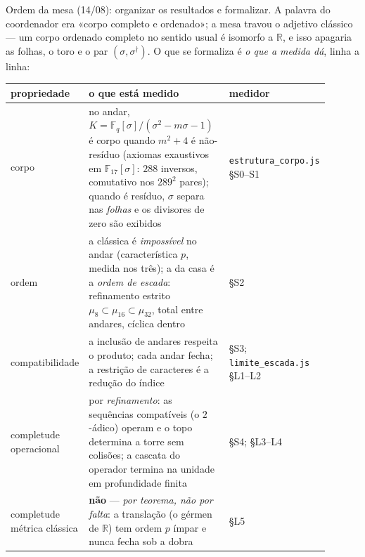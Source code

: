 \documentclass[11pt,a4paper]{article}
\newcommand{\code}[1]{\texttt{\small #1}}
\begin{document}
Ordem da mesa (14/08): organizar os resultados e formalizar. A palavra
do coordenador era «corpo completo e ordenado»; a mesa travou o
adjetivo clássico --- um corpo ordenado completo no sentido usual é
isomorfo a $\mathbb{R}$, e isso apagaria as folhas, o toro e o par
$(\sigma,\sigma^{\dagger})$. O que se formaliza é \emph{o que a medida
dá}, linha a linha:

\begin{center}
\begin{tabular}{p{0.21\linewidth}p{0.44\linewidth}p{0.25\linewidth}}
\textbf{propriedade} & \textbf{o que está medido} & \textbf{medidor} \\
\hline
corpo &
no andar, $K=\mathbb{F}_{q}[\sigma]/(\sigma^{2}{-}m\sigma{-}1)$ é
corpo quando $m^{2}{+}4$ é não-resíduo (axiomas exaustivos em
$\mathbb{F}_{17}[\sigma]$: $288$ inversos, comutativo nos $289^{2}$
pares); quando é resíduo, $\sigma$ separa nas \emph{folhas} e os
divisores de zero são exibidos &
\code{estrutura\_corpo.js} \S S0--S1 \\
ordem &
a clássica é \emph{impossível} no andar (característica $p$, medida
nos três); a da casa é a \emph{ordem de escada}: refinamento estrito
$\mu_{8}\subset\mu_{16}\subset\mu_{32}$, total entre andares,
cíclica dentro &
\S S2 \\
compatibilidade &
a inclusão de andares respeita o produto; cada andar fecha; a
restrição de caracteres é a redução do índice &
\S S3; \code{limite\_escada.js} \S L1--L2 \\
completude operacional &
por \emph{refinamento}: as sequências compatíveis (o $2$-ádico)
operam e o topo determina a torre sem colisões; a cascata do operador
termina na unidade em profundidade finita &
\S S4; \S L3--L4 \\
completude métrica clássica &
\textbf{não} --- \emph{por teorema, não por falta}: a translação (o
gérmen de $\mathbb{R}$) tem ordem $p$ ímpar e nunca fecha sob a
dobra &
\S L5 \\
\end{tabular}
\end{center}
\end{document}
